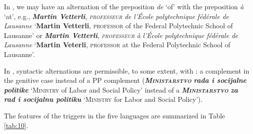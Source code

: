 \documentclass[output=paper]{langsci/langscibook}
\newcommand{\trigger}[1]{\textsc{#1}}
\begin{document}
In , we may have an alternation of the preposition \textit{de}
‘of’ with the preposition \textit{à} ‘at’, e.g., \textbf{\textit{Martin
Vetterli}}, \textit{\trigger{professeur}} \textit{de l'École
polytechnique fédérale de Lausanne} `\textbf{Martin Vetterli},
\trigger{professor} of the Federal Polytechnic School of Lausanne' or
\textbf{\textit{Martin Vetterli}}, \textit{\trigger{professeur}}
\textit{à l'École polytechnique fédérale de Lausanne }`\textbf{Martin
Veterli}, \trigger{professor} at the Federal Polytechnic School of
Lausanne'.




In , syntactic alternations are permissible, to some extent, with
: a complement in the genitive case instead of a PP complement
(\textbf{\textit{\trigger{Ministarstvo}}} \textbf{\textit{rada i socijalne politike}} `\trigger{Ministry} of Labor and
Social Policy’ instead of a \textbf{\textit{\trigger{Ministarstvo}}}
\textbf{\textit{za rad i socijalnu politiku}}
`\trigger{Ministry} for Labor and Social Policy’).

The features of the triggers in the five languages are summarized in Table \ref{tab:10}.
\end{document}

